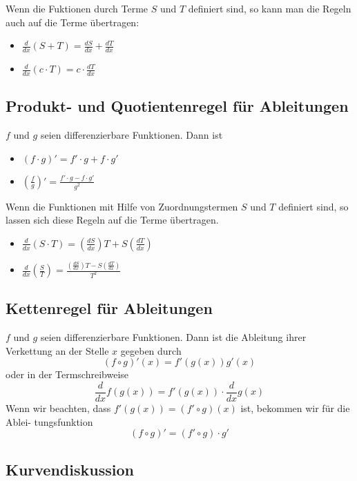 \documentclass[10pt,a4paper]{article}
\begin{document}
Wenn die Fuktionen durch Terme $S$ und $T$ definiert sind, so kann man die Regeln auch auf die Terme übertragen:
\begin{itemize}
	\item $\displaystyle\frac{d}{dx}(S + T) = \frac{dS}{dx} + \frac{dT}{dx}$
	\item $\displaystyle\frac{d}{dx}(c \cdot T) = c \cdot \frac{dT}{dx}$
\end{itemize}


\subsection{Produkt- und Quotientenregel für Ableitungen}

$f$ und $g$ seien differenzierbare Funktionen. Dann ist
\begin{itemize}
	\item $\displaystyle(f \cdot g)' = f' \cdot g + f \cdot g'$
	\item $\displaystyle\left(\frac{f}{g}\right)' = \frac{f' \cdot g - f \cdot g'}{g^2}$
\end{itemize}

Wenn die Funktionen mit Hilfe von Zuordnungstermen $S$ und $T$ definiert sind, so lassen sich diese Regeln auf die Terme übertragen.
\begin{itemize}
	\item $\displaystyle\frac{d}{dx}(S \cdot T) = \left(\frac{dS}{dx}\right)T + S\left(\frac{dT}{dx}\right)$
	\item $\displaystyle\frac{d}{dx}\left(\frac{S}{T}\right) = \frac{\displaystyle\left(\frac{dS}{dx}\right)T - S\left(\frac{dT}{dx}\right)}{T^2}$
\end{itemize}


\subsection{Kettenregel für Ableitungen}

$f$ und $g$ seien differenzierbare Funktionen. Dann ist die Ableitung ihrer Verkettung an der Stelle $x$ gegeben durch
$$(f \circ g)'(x) = f'(g(x))g'(x)$$
oder in der Termschreibweise
$$\frac{d}{dx}f(g(x)) = f'(g(x)) \cdot \frac{d}{dx}g(x)$$
Wenn wir beachten, dass $f'(g(x)) = (f' \circ g)(x)$ ist, bekommen wir für die Ablei-
tungsfunktion
$$(f \circ g)' = (f' \circ g) \cdot g'$$


\subsection{Kurvendiskussion}
\end{document}
